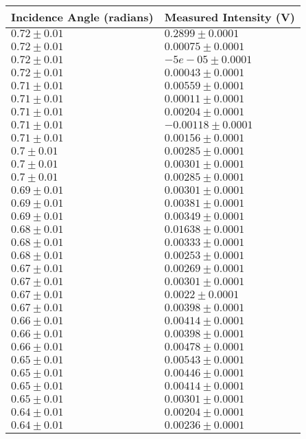 \begin{tabular}{| p{} | p{} |}
\hline
Incidence Angle (radians) & Measured Intensity (V)\\
\hline
$0.72 \pm 0.01$ & $0.2899 \pm 0.0001$\\
$0.72 \pm 0.01$ & $0.00075 \pm 0.0001$\\
$0.72 \pm 0.01$ & $-5e-05 \pm 0.0001$\\
$0.72 \pm 0.01$ & $0.00043 \pm 0.0001$\\
$0.71 \pm 0.01$ & $0.00559 \pm 0.0001$\\
$0.71 \pm 0.01$ & $0.00011 \pm 0.0001$\\
$0.71 \pm 0.01$ & $0.00204 \pm 0.0001$\\
$0.71 \pm 0.01$ & $-0.00118 \pm 0.0001$\\
$0.71 \pm 0.01$ & $0.00156 \pm 0.0001$\\
$0.7 \pm 0.01$ & $0.00285 \pm 0.0001$\\
$0.7 \pm 0.01$ & $0.00301 \pm 0.0001$\\
$0.7 \pm 0.01$ & $0.00285 \pm 0.0001$\\
$0.69 \pm 0.01$ & $0.00301 \pm 0.0001$\\
$0.69 \pm 0.01$ & $0.00381 \pm 0.0001$\\
$0.69 \pm 0.01$ & $0.00349 \pm 0.0001$\\
$0.68 \pm 0.01$ & $0.01638 \pm 0.0001$\\
$0.68 \pm 0.01$ & $0.00333 \pm 0.0001$\\
$0.68 \pm 0.01$ & $0.00253 \pm 0.0001$\\
$0.67 \pm 0.01$ & $0.00269 \pm 0.0001$\\
$0.67 \pm 0.01$ & $0.00301 \pm 0.0001$\\
$0.67 \pm 0.01$ & $0.0022 \pm 0.0001$\\
$0.67 \pm 0.01$ & $0.00398 \pm 0.0001$\\
$0.66 \pm 0.01$ & $0.00414 \pm 0.0001$\\
$0.66 \pm 0.01$ & $0.00398 \pm 0.0001$\\
$0.66 \pm 0.01$ & $0.00478 \pm 0.0001$\\
$0.65 \pm 0.01$ & $0.00543 \pm 0.0001$\\
$0.65 \pm 0.01$ & $0.00446 \pm 0.0001$\\
$0.65 \pm 0.01$ & $0.00414 \pm 0.0001$\\
$0.65 \pm 0.01$ & $0.00301 \pm 0.0001$\\
$0.64 \pm 0.01$ & $0.00204 \pm 0.0001$\\
$0.64 \pm 0.01$ & $0.00236 \pm 0.0001$\\
\hline
\end{tabular}\\
